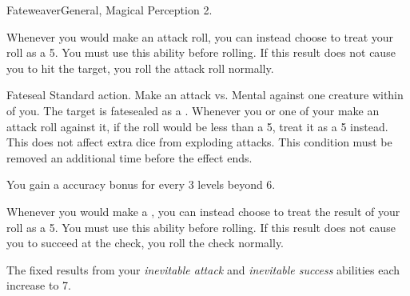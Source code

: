   \begin{feat}{Fateweaver}{General, Magical}
    \featpre Perception 2.

     Whenever you would make an attack roll, you can instead choose to treat your roll as a 5.
    You must use this ability before rolling.
    If this result does not cause you to hit the target, you roll the attack roll normally.

    \begin{magicalactiveability}{Fateseal}
      \abilityusagetime Standard action.
      \rankline
      Make an attack vs. Mental against one creature within \medrange of you.
      \hit The target is fatesealed as a .
      Whenever you or one of your  make an attack roll against it, if the roll would be less than a 5, treat it as a 5 instead.
      This does not affect extra dice from exploding attacks.
      \crit This condition must be removed an additional time before the effect ends.

      \rankline
      You gain a  accuracy bonus for every 3 levels beyond 6.
    \end{magicalactiveability}

     Whenever you would make a , you can instead choose to treat the result of your roll as a 5.
    You must use this ability before rolling.
    If this result does not cause you to succeed at the check, you roll the check normally.

     The fixed results from your \textit{inevitable attack} and \textit{inevitable success} abilities each increase to 7.
  \end{feat}



